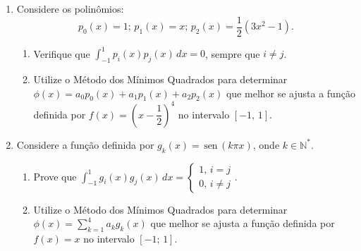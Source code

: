 \documentclass[12pt,a4paper]{article}
\newcommand{\sen}{\,\textrm{sen}\,}
\begin{document}
\begin{enumerate}
   \item Considere os polinômios:
   $$p_0(x) = 1;\, p_1(x) = x;\,p_2(x) = \frac{1}{2}(3x^2 - 1).$$

   \begin{enumerate}
    \item Verifique que $\displaystyle\int_{-1}^1 p_i(x)p_j(x)\,dx = 0$, sempre que $i\neq j$.
    \item Utilize o Método dos Mínimos Quadrados para determinar $\phi(x) = a_0p_0(x) + a_1p_1(x) + a_2p_2(x)$ que melhor se ajusta a função definida por 
          $f(x) = \left(x - \dfrac{1}{2}\right)^4$ no intervalo $[-1,\, 1]$.
   \end{enumerate}

 \item Considere a função definida por $g_k(x)=\sen(k\pi x)$, onde $k\in\mathbb{N}^*$.

   \begin{enumerate}
    \item Prove que $\displaystyle\int_{-1}^1 g_i(x)g_j(x)\,dx = \begin{cases}1,\,i = j \\ 0,\,i\neq j\end{cases}$.
    \item Utilize o Método dos Mínimos Quadrados para determinar $\displaystyle \phi(x) = \sum_{k=1}^4 a_kg_k(x)$ que melhor se ajusta a função definida por 
          $f(x) = x$ no intervalo $[-1;\, 1]$.
   \end{enumerate}
  
\end{enumerate}
\end{document}
